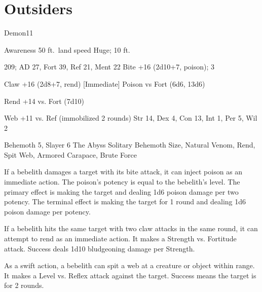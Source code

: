 \section{Outsiders}

    \begin{monsection}[Bebelith]{Demon}{11}
        \begin{spellcontent}
            \begin{spelltargetinginfo}
                \pari {} Awareness 
                \pari {} 50 ft.\ land speed
                \pari {} Huge;  10 ft.
            \end{spelltargetinginfo}
            \begin{spelleffects}
                \pari {} 209;  AD 27, Fort 39, Ref 21, Ment 22
                \pari {} Bite +16 (2d10+7, poison);  3
                \par Claw +16 (2d8+7, rend)
                \pari {} [Immediate] Poison  vs Fort (6d6, 13d6)
                \par [Immediate] Rend +14 vs. Fort (7d10)
                \par [Swift] Web +11 vs. Ref (immobilized 2 rounds)
                \pari {} Str 14, Dex 4, Con 13, Int 1, Per 5, Wil 2
            \end{spelleffects}
        \end{spellcontent}
        \begin{spellfooter}
            \pari {} Behemoth 5, Slayer 6
            \pari {} The Abyss
            \pari {} Solitary
            \pari {} Behemoth Size, Natural Venom, Rend, Spit Web, Armored Carapace, Brute Force
        \end{spellfooter}
    \end{monsection}

     If a bebelith damages a target with its bite attack, it can inject poison as an immediate action. The poison's potency is equal to the bebelith's level. The primary effect is making the target \sickened and dealing 1d6 poison damage per two potency. The terminal effect is making the target \nauseated for 1 round and dealing 1d6 poison damage per potency.

     If a bebelith hits the same target with two claw attacks in the same round, it can attempt to rend as an immediate action. It makes a Strength vs. Fortitude attack. Success deals 1d10 bludgeoning damage per Strength.

     As a swift action, a bebelith can spit a web at a creature or object within \rngmed range. It makes a Level vs. Reflex attack against the target. Success means the target is \immobilized for 2 rounds.
